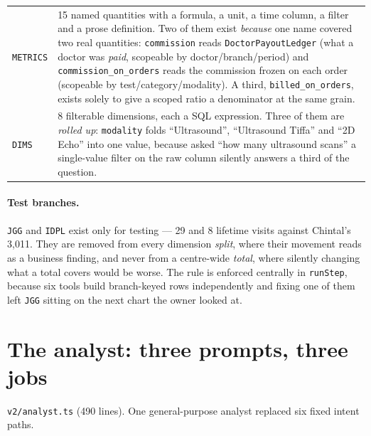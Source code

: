 \documentclass[11pt,a4paper]{report}
\newcommand{\file}[1]{\texttt{\small #1}}
\newcommand{\code}[1]{\texttt{\small #1}}
\begin{document}
\begin{center}
\small
\begin{tabular}{@{}p{3.2cm}p{11.6cm}@{}}
\toprule
\code{METRICS} & 15 named quantities with a formula, a unit, a time column, a filter and a prose
 definition. Two of them exist \emph{because} one name covered two real quantities:
 \code{commission} reads \code{DoctorPayoutLedger} (what a doctor was \emph{paid}, scopeable by
 doctor/branch/period) and \code{commission\_on\_orders} reads the commission frozen on each order
 (scopeable by test/category/modality). A third, \code{billed\_on\_orders}, exists solely to give a
 scoped ratio a denominator at the same grain.\\[3pt]
\code{DIMS} & 8 filterable dimensions, each a SQL expression. Three of them are \emph{rolled up}:
 \code{modality} folds ``Ultrasound'', ``Ultrasound Tiffa'' and ``2D Echo'' into one value, because
 asked ``how many ultrasound scans'' a single-value filter on the raw column silently answers a
 third of the question.\\
\bottomrule
\end{tabular}
\end{center}

\paragraph{Test branches.} \code{JGG} and \code{IDPL} exist only for testing --- 29 and 8 lifetime
visits against Chintal's 3{,}011. They are removed from every dimension \emph{split}, where their
movement reads as a business finding, and never from a centre-wide \emph{total}, where silently
changing what a total covers would be worse. The rule is enforced centrally in \code{runStep},
because six tools build branch-keyed rows independently and fixing one of them left \code{JGG}
sitting on the next chart the owner looked at.

\section{The analyst: three prompts, three jobs}

\file{v2/analyst.ts} (490 lines). One general-purpose analyst replaced six fixed intent paths.
\end{document}
